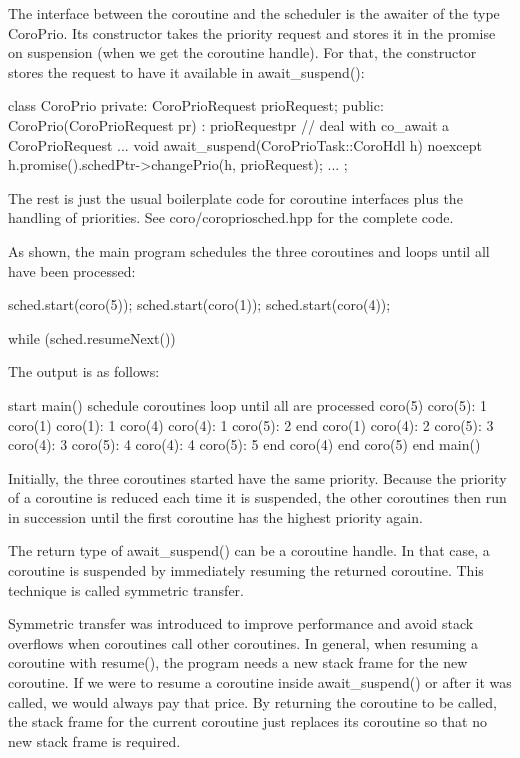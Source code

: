The interface between the coroutine and the scheduler is the awaiter of the type CoroPrio. Its constructor takes the priority request and stores it in the promise on suspension (when we get the coroutine handle). For that, the constructor stores the request to have it available in await\_suspend():

\begin{cpp}
class CoroPrio {
private:
	CoroPrioRequest prioRequest;
public:
	CoroPrio(CoroPrioRequest pr)
	: prioRequest{pr} { // deal with co_await a CoroPrioRequest
	}
	...
	void await_suspend(CoroPrioTask::CoroHdl h) noexcept {
		h.promise().schedPtr->changePrio(h, prioRequest);
	}
	...
};
\end{cpp}

The rest is just the usual boilerplate code for coroutine interfaces plus the handling of priorities. See coro/coropriosched.hpp for the complete code.

As shown, the main program schedules the three coroutines and loops until all have been processed:

\begin{cpp}
sched.start(coro(5));
sched.start(coro(1));
sched.start(coro(4));

while (sched.resumeNext()) {
}
\end{cpp}

The output is as follows:

\begin{shell}
start main()
schedule coroutines
loop until all are processed
	coro(5)
	coro(5): 1
	coro(1)
	coro(1): 1
	coro(4)
	coro(4): 1
	coro(5): 2
	end coro(1)
	coro(4): 2
	coro(5): 3
	coro(4): 3
	coro(5): 4
	coro(4): 4
	coro(5): 5
	end coro(4)
	end coro(5)
end main()
\end{shell}

Initially, the three coroutines started have the same priority. Because the priority of a coroutine is reduced each time it is suspended, the other coroutines then run in succession until the first coroutine has the highest priority again.


The return type of await\_suspend() can be a coroutine handle. In that case, a coroutine is suspended by immediately resuming the returned coroutine. This technique is called symmetric transfer.

Symmetric transfer was introduced to improve performance and avoid stack overflows when coroutines call other coroutines. In general, when resuming a coroutine with resume(), the program needs a new stack frame for the new coroutine. If we were to resume a coroutine inside await\_suspend() or after it was called, we would always pay that price. By returning the coroutine to be called, the stack frame for the current coroutine just replaces its coroutine so that no new stack frame is required.

